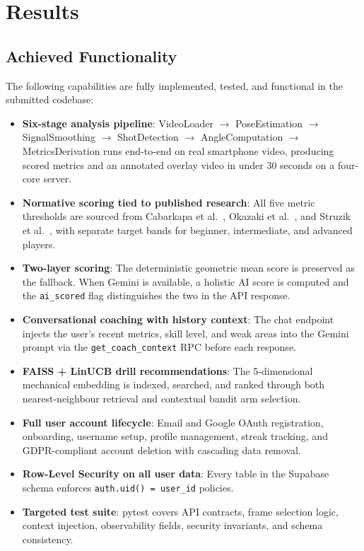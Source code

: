 \section{Results}
\label{sec:results}

\subsection{Achieved Functionality}

The following capabilities are fully implemented, tested, and functional in the submitted codebase:

\begin{itemize}
  \item \textbf{Six-stage analysis pipeline}: VideoLoader $\rightarrow$ PoseEstimation $\rightarrow$ SignalSmoothing $\rightarrow$ ShotDetection $\rightarrow$ AngleComputation $\rightarrow$ MetricsDerivation runs end-to-end on real smartphone video, producing scored metrics and an annotated overlay video in under 30 seconds on a four-core server.
  \item \textbf{Normative scoring tied to published research}: All five metric thresholds are sourced from Cabarkapa et al.~\cite{Cabarkapa2021}, Okazaki et al.~\cite{Okazaki2012}, and Struzik et al.~\cite{Struzik2014}, with separate target bands for beginner, intermediate, and advanced players.
  \item \textbf{Two-layer scoring}: The deterministic geometric mean score is preserved as the fallback. When Gemini is available, a holistic AI score is computed and the \lstinline|ai_scored| flag distinguishes the two in the API response.
  \item \textbf{Conversational coaching with history context}: The chat endpoint injects the user's recent metrics, skill level, and weak areas into the Gemini prompt via the \lstinline|get_coach_context| RPC before each response.
  \item \textbf{FAISS + LinUCB drill recommendations}: The 5-dimensional mechanical embedding is indexed, searched, and ranked through both nearest-neighbour retrieval and contextual bandit arm selection.
  \item \textbf{Full user account lifecycle}: Email and Google OAuth registration, onboarding, username setup, profile management, streak tracking, and GDPR-compliant account deletion with cascading data removal.
  \item \textbf{Row-Level Security on all user data}: Every table in the Supabase schema enforces \lstinline|auth.uid() = user_id| policies.
  \item \textbf{Targeted test suite}: pytest covers API contracts, frame selection logic, context injection, observability fields, security invariants, and schema consistency.
\end{itemize}

